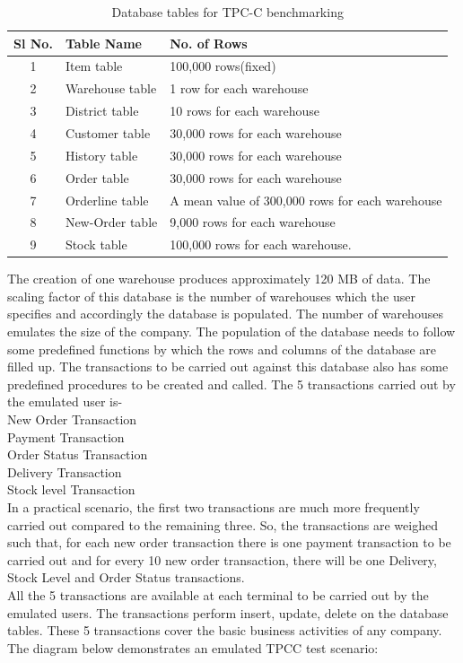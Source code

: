 \documentclass[12pt]{book}
\begin{document}
 \begin{table}[H]
  \begin{center}
   \begin{tabular}{|c|l|p{9cm}|} 
   \hline
   \textbf{Sl No.} & \textbf{Table Name} & \textbf{No. of Rows}\\
   \hline
   1 & Item table & 100,000 rows(fixed) \\
   \hline
   2 & Warehouse table & 1 row for each warehouse \\
   \hline
   3 & District table & 10 rows for each warehouse\\
   \hline
   4 & Customer table & 30,000 rows for each warehouse\\
   \hline
   5 & History table & 30,000 rows for each warehouse \\
   \hline
   6 & Order table & 30,000 rows for each warehouse \\
   \hline
   7 & Orderline table & A mean value of 300,000 rows for each warehouse\\
   \hline 
   8 & New-Order table & 9,000 rows for each warehouse\\
   \hline
   9 & Stock table & 100,000 rows for each warehouse. \\
   \hline    
   \end{tabular}
   \caption{Database tables for TPC-C benchmarking}
  \end{center}
 \end{table}
 
The creation of one warehouse produces approximately 120 MB of data. 
The scaling factor of this database is the number of warehouses which the user specifies and accordingly the database is populated.
 The number of warehouses emulates the size of the company.
 The population of the database needs to follow some predefined functions by which the rows and columns of the database are filled up.
 The transactions to be carried out against this database also has some predefined procedures to be created and called.
 The 5 transactions carried out by the emulated user is-\\
 New Order Transaction\\
Payment Transaction\\
Order Status Transaction\\
Delivery Transaction\\ 
Stock level Transaction\\
In a practical scenario, the first two transactions are much more frequently carried out compared to the remaining three.
 So, the transactions are weighed such that, for each new order transaction there is one payment transaction to be carried out
 and for every 10 new order transaction, there will be one Delivery, Stock Level and Order Status transactions.\\ 
 All the 5 transactions are available at each terminal to be carried out by the emulated users.
 The transactions perform insert, update, delete on the database tables.
 These 5 transactions cover the basic business activities of any company.\\
The diagram below demonstrates an emulated TPCC test scenario:
\end{document}
